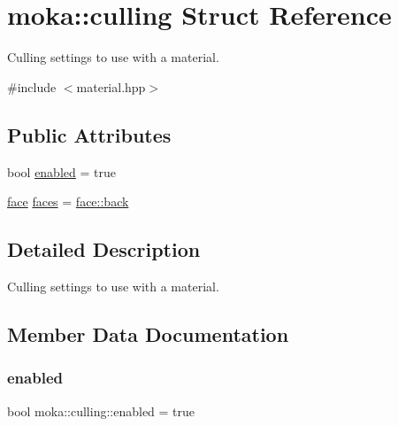\hypertarget{structmoka_1_1culling}{}\section{moka\+::culling Struct Reference}
\label{structmoka_1_1culling}


Culling settings to use with a material.  




{\ttfamily \#include $<$material.\+hpp$>$}

\subsection*{Public Attributes}
\begin{DoxyCompactItemize}
\item 
bool \mbox{\hyperlink{structmoka_1_1culling_afb5b5f5ed1f739945ef87f471c87a943}{enabled}} = true
\item 
\mbox{\hyperlink{namespacemoka_a262acd665924ba4041f64f7207b17cbe}{face}} \mbox{\hyperlink{structmoka_1_1culling_aba354f20a5b4a4b49d69d8747b2a6b5a}{faces}} = \mbox{\hyperlink{namespacemoka_a262acd665924ba4041f64f7207b17cbea469bba0a564235dfceede42db14f17b0}{face\+::back}}
\end{DoxyCompactItemize}


\subsection{Detailed Description}
Culling settings to use with a material. 

\subsection{Member Data Documentation}
\mbox{\label{structmoka_1_1culling_afb5b5f5ed1f739945ef87f471c87a943}} 
\subsubsection{\texorpdfstring{enabled}{enabled}}
{\footnotesize\ttfamily bool moka\+::culling\+::enabled = true}

\mbox{\label{structmoka_1_1culling_aba354f20a5b4a4b49d69d8747b2a6b5a}} 
